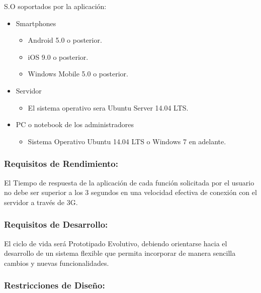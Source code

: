             
            S.O soportados por la aplicación:
            \begin{itemize}
                \item Smartphones 
                \begin{itemize}
                    \item Android 5.0 o posterior.
                    \item iOS 9.0 o posterior.
                    \item Windows Mobile 5.0 o posterior. 
                \end{itemize}
                \item Servidor 
                \begin{itemize}
                    \item  El sistema operativo sera Ubuntu Server 14.04 LTS. 
                \end{itemize}
                \item PC o notebook de los administradores 
                \begin{itemize}
                    \item Sistema Operativo Ubuntu 14.04 LTS o Windows 7 en adelante. 
                \end{itemize} 
            \end{itemize}
            
        \subsubsection{Requisitos de Rendimiento:}
        
        El Tiempo de respuesta de la aplicación de cada función solicitada por el usuario no debe ser superior a los 3 segundos en una velocidad efectiva de conexión con el servidor a través de 3G.
        
        \subsubsection{Requisitos de Desarrollo:}
        
        El ciclo de vida será Prototipado Evolutivo, debiendo orientarse hacia el desarrollo de un sistema flexible que permita incorporar de manera sencilla cambios y nuevas funcionalidades.
        
       \subsubsection{Restricciones de Diseño:}
       
